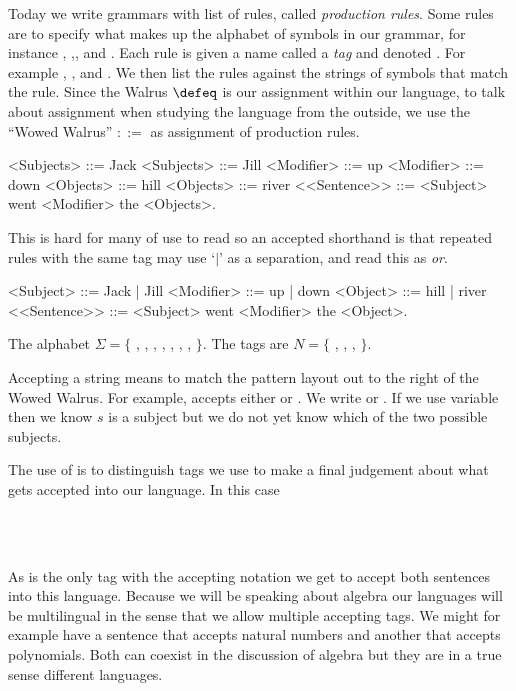 Today we write grammars with
list of rules, called \emph{production rules}.  Some rules are to specify what
makes up the alphabet of symbols in our grammar, for instance , 
,\code{+}, and .  Each rule is given a name called
a \emph{tag} and denoted . For example , 
, and .  We then list the rules against
the strings of symbols that match the rule.  Since the Walrus
$\defeq$ is our assignment within our language, to talk about assignment 
when studying the language from the outside, we use the
``Wowed Walrus'' $::=$ as assignment of production rules.   
\begin{center}
\begin{Gcode}[]
<Subjects> ::= Jack 
<Subjects> ::= Jill 
<Modifier> ::= up
<Modifier> ::= down
<Objects>  ::= hill
<Objects>  ::= river
<<Sentence>> ::= <Subject> went <Modifier> the <Objects>.
\end{Gcode}
\end{center}
This is hard for many of use to read so an accepted shorthand is that 
repeated rules with the same tag may use `$|$' as a separation, and 
read this as \emph{or}.
\begin{center}
\begin{Gcode}[]
<Subject> ::= Jack | Jill
<Modifier> ::= up | down 
<Object>  ::= hill | river
<<Sentence>> ::= <Subject> went <Modifier> the <Object>.
\end{Gcode}
\end{center}
The alphabet $\Sigma=\{$ , , 
, , , , , $\}$.
The tags are $N=\{$ , , , 
$\}$. 

Accepting a string means to match the pattern layout out to the right 
of the Wowed Walrus.  For example,  accepts either 
or .  We write  or .
If we use variable  then we know $s$ is a subject but 
we do not yet know which of the two possible subjects.  


The use of  is to distinguish tags we use to make a final 
judgement about what gets accepted into our language.  In this case 
\begin{center}
    \\
    \\
\end{center}
As  is the only tag with the accepting notation 
we get to accept both sentences into this language. 
Because we will be speaking about algebra our languages will be 
multilingual in the sense that we allow multiple accepting tags.
We might for example have a sentence that accepts natural numbers 
and another that accepts polynomials.  Both can coexist in the discussion 
of algebra but they are in a true sense different languages.

